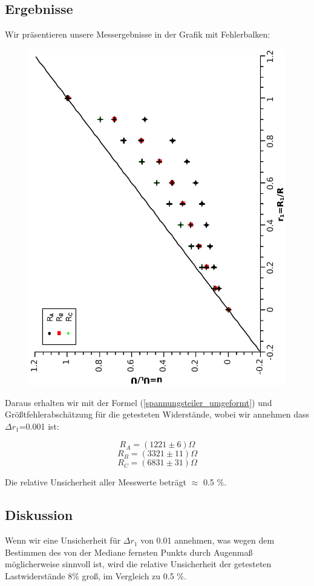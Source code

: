 \documentclass{article}
\begin{document}
\subsection{Ergebnisse}
Wir präsentieren unsere Messergebnisse in der Grafik mit Fehlerbalken:
\begin{center}
\begin{figure} [H]
\includegraphics[scale=0.5,angle=-90]{spannungsteiler.eps}
\end{figure}
\end{center}
Daraus erhalten wir mit der Formel (\ref{spannungsteiler_umgeformt}) und Größtfehlerabschätzung für die getesteten Widerstände, wobei wir annehmen dass $\Delta r_1$=0.001 ist:

$$R_A=(1221\pm6) \Omega$$
$$R_B=(3321 \pm 11) \Omega $$
$$R_C=(6831 \pm 31) \Omega $$

Die relative Unsicherheit aller Messwerte beträgt $\approx$ 0.5 \%.
\subsection{Diskussion}
Wenn wir eine Unsicherheit für $\Delta r_1$ von 0.01 annehmen, was wegen dem Bestimmen des von der Mediane fernsten Punkts durch Augenmaß möglicherweise sinnvoll ist, wird die relative Unsicherheit der getesteten Lastwiderstände 8\% groß, im Vergleich zu  0.5 \%. \\
\end{document}
